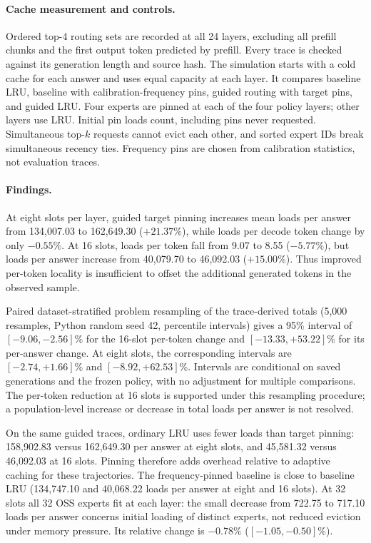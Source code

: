 \paragraph{Cache measurement and controls.}
Ordered top-4 routing sets are recorded at all 24 layers, excluding all
prefill chunks and the first output token predicted by prefill. Every
trace is checked against its generation length and source hash. The
simulation starts with a cold cache for each answer and uses equal
capacity at each layer. It compares baseline LRU, baseline with
calibration-frequency pins, guided routing with target pins, and guided
LRU. Four experts are pinned at each of the four policy layers; other
layers use LRU. Initial pin loads count, including pins never requested.
Simultaneous top-$k$ requests cannot evict each other, and sorted expert
IDs break simultaneous recency ties. Frequency pins are chosen from
calibration statistics, not evaluation traces.



\paragraph{Findings.}
At eight slots per layer, guided target pinning increases mean loads per
answer from 134,007.03 to 162,649.30 ($+21.37\%$), while loads per decode
token change by only $-0.55\%$. At 16 slots, loads per token fall from
9.07 to 8.55 ($-5.77\%$), but loads per answer increase from 40,079.70 to
46,092.03 ($+15.00\%$). Thus improved per-token locality is insufficient
to offset the additional generated tokens in the observed sample.

Paired dataset-stratified problem resampling of the trace-derived totals
(5,000 resamples, Python random seed 42, percentile intervals) gives a
95\% interval of $[-9.06,-2.56]\%$ for the 16-slot per-token change and
$[-13.33,+53.22]\%$ for its per-answer change. At eight slots, the
corresponding intervals are $[-2.74,+1.66]\%$ and $[-8.92,+62.53]\%$.
Intervals are conditional on saved generations and the frozen policy,
with no adjustment for multiple comparisons. The per-token reduction at
16 slots is supported under this resampling procedure; a population-level
increase or decrease in total loads per answer is not resolved.

On the same guided traces, ordinary LRU uses fewer loads than target
pinning: 158,902.83 versus 162,649.30 per answer at eight slots, and
45,581.32 versus 46,092.03 at 16 slots. Pinning therefore adds overhead
relative to adaptive caching for these trajectories. The frequency-pinned
baseline is close to baseline LRU (134,747.10 and 40,068.22 loads per
answer at eight and 16 slots). At 32 slots all 32 OSS experts fit at each
layer: the small decrease from 722.75 to 717.10 loads per answer concerns
initial loading of distinct experts, not reduced eviction under memory
pressure. Its relative change is $-0.78\%$ ($[-1.05,-0.50]\%$).

